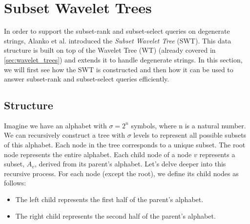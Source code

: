 \section{Subset Wavelet Trees} \label{sec:subset_wavelet_trees}
In order to support the subset-rank and subset-select queries on degenerate strings, Alanko et al. \cite{SubsetWT} introduced the \emph{Subset Wavelet Tree} (SWT). This data structure is built on top of the Wavelet Tree (WT) \cite{GrossiWT2003} (already covered in \autoref{sec:wavelet_trees}) and extends it to handle degenerate strings. In this section, we will first see how the SWT is constructed and then how it can be used to answer subset-rank and subset-select queries efficiently.

\subsection{Structure} \label{sec:swt_structure}

Imagine we have an alphabet with $\sigma = 2^n$ symbols, where n is a natural number. We can recursively construct a tree with $\sigma$ levels to represent all possible subsets of this alphabet. Each node in the tree corresponds to a unique subset. The root node represents the entire alphabet. Each child node of a node $v$ represents a subset, $A_v$, derived from its parent's alphabet. Let's delve deeper into this recursive process. For each node (except the root), we define its child nodes as follows:

\begin{itemize}
    \item The left child represents the first half of the parent's alphabet.
    \item The right child represents the second half of the parent's alphabet.
\end{itemize}

